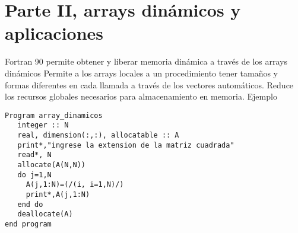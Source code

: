 \documentclass[11pt]{exam}
\begin{document}
\noindent
\section{Parte II, arrays din\'amicos y aplicaciones}
Fortran 90 permite obtener y liberar memoria din\'amica a trav\'es de los arrays din\'amicos Permite a los arrays locales a un procedimiento tener tama\~nos y formas diferentes en cada llamada a trav\'es de los vectores autom\'aticos. Reduce los recursos globales necesarios para almacenamiento en memoria.
Ejemplo\\
\begin{verbatim}
Program array_dinamicos
   integer :: N
   real, dimension(:,:), allocatable :: A
   print*,"ingrese la extension de la matriz cuadrada"
   read*, N
   allocate(A(N,N))
   do j=1,N
     A(j,1:N)=(/(i, i=1,N)/)
     print*,A(j,1:N)
   end do
   deallocate(A)
end program 
\end{verbatim}
\end{document}
